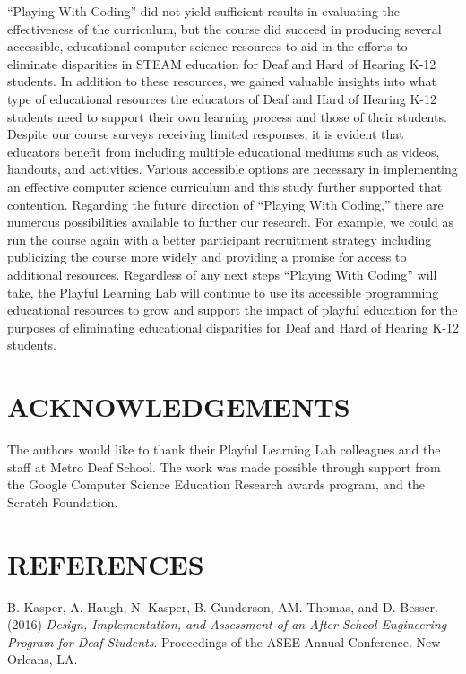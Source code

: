 \documentclass[11.5pt]{sig-alternate} %
\begin{document}
\begin{large}
“Playing With Coding” did not yield sufficient results in evaluating the effectiveness of the curriculum, but the course did succeed in producing several accessible, educational computer science resources to aid in the efforts to eliminate disparities in STEAM education for Deaf and Hard of Hearing K-12 students. In addition to these resources, we gained valuable insights into what type of educational resources the educators of Deaf and Hard of Hearing K-12 students need to support their own learning process and those of their students. Despite our course surveys receiving limited responses, it is evident that educators benefit from including multiple educational mediums such as videos, handouts, and activities. Various accessible options are necessary in implementing an effective computer science curriculum and this study further supported that contention. Regarding the future direction of “Playing With Coding,” there are numerous possibilities available to further our research. For example, we could as run the course again with a better participant recruitment strategy including publicizing the course more widely and providing a promise for access to additional resources. Regardless of any next steps “Playing With Coding” will take, the Playful Learning Lab will continue to use its accessible programming educational resources to grow and support the impact of playful education for the purposes of eliminating educational disparities for Deaf and Hard of Hearing K-12 students.  

\section*{ACKNOWLEDGEMENTS}
The authors would like to thank their Playful Learning Lab colleagues and the staff at Metro Deaf School. The work was made possible through support from the Google Computer Science Education Research awards program, and the Scratch Foundation.

\end{large}
\clearpage
\section*{REFERENCES}\par 

\leftskip 0.25in
\parindent -0.25in %

B. Kasper, A. Haugh, N. Kasper, B. Gunderson, AM. Thomas, and D. Besser. (2016) \textit{Design, Implementation, and Assessment of an After-School Engineering Program for Deaf Students}. Proceedings of the ASEE Annual Conference. New Orleans, LA. 
\end{document}
